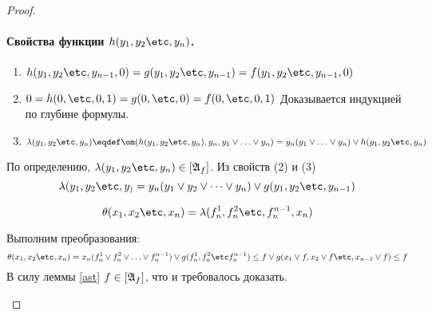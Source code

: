 \documentclass[unicode,10pt]{article}
\begin{document}
\begin{proof}
\begin{itemize}
\begin{itemize}
\begin{itemize}
              \paragraph {Свойства функции $h(\set[y]{n})$.}
              \begin{enumerate}
                \item
                  \begin{math}
                    h(\set[y]{n-1},0)=g(\set[y]{n-1}) = f(\set[y]{n-1},0)
                  \end{math}
                \item \ACC
                  \begin{math}
                    0 = h(0,\etc,0,1) = g(0,\etc,0) = f(0,\etc,0,1)
                  \end{math}
                  Доказывается индукцией по глубине формулы. \PROOF
                \item
                  \begin{denote}
                    \begin{displaymath}
                      \lambda(\set[y]{n})\eqdef \om(h(\set[y]{n}),y_{n},\svee[y]{1}{n}) =y_n(\svee[y]{1}{n})\vee h(\set[y]{n})
                    \end{displaymath}
                  \end{denote}
              \end{enumerate}
              По определению, $\lambda(\set[y]{n}) \in [\ag_f]$. Из свойств (2) и (3)
              \begin{displaymath}
                \lambda(\set[y])=y_n(\dsn[y])\vee g(y_1,y_2\etc,y_{n-1})
              \end{displaymath}
              \begin{denote}
                \begin{displaymath}
                  \theta(\set[x]{n})=\lambda(f^1_n,f^2_n\etc,f^{n-1}_n,x_n)
                \end{displaymath}
              \end{denote}
              Выполним преобразования:\\
              \begin{displaymath}
              \theta(\set[x]{n})=x_n(f^1_n\vee f^2_n\vee\ldots\vee f^{n-1}_n)\vee g(f^1_n,f^2_n\etc f^{n-1}_n)
              \le f\vee g(x_1\vee f,x_2\vee f\etc,x_{n-1}\vee f) \le f
              \end{displaymath}
              В силу леммы \ref{ast} $f\in[\mathfrak{A}_f]$, что и требовалось доказать.
          \end{itemize}
      \end{itemize}
  \end{itemize}
\end{proof}
\end{document}
